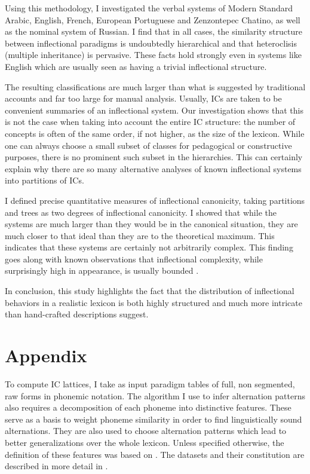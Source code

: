 \documentclass[output=paper]{langscibook}
\begin{document}
    Using this methodology, I investigated the verbal systems of Modern Standard Arabic, English, French, European Portuguese and Zenzontepec Chatino, as well as the nominal system of Russian. I find that in all cases, the similarity structure between inflectional paradigms is undoubtedly hierarchical and that heteroclisis (multiple inheritance) is pervasive. These facts hold strongly even in systems like English which are usually seen as having a trivial inflectional structure.

    The resulting classifications are much larger than what is suggested by traditional accounts and far too large for manual analysis. Usually, ICs are  taken to be convenient summaries of an inflectional system. Our investigation shows that this is not the case when taking into account the entire IC structure: the number of concepts is often of the same order, if not higher, as the size of the lexicon. While one can always choose a small subset of classes for pedagogical or constructive purposes, there is no prominent such subset in the hierarchies. This can certainly explain why there are so many alternative analyses of known inflectional systems into partitions of ICs.

    I defined precise quantitative measures of inflectional canonicity, taking partitions and trees as two degrees of inflectional canonicity. I showed that while the systems are much larger than they would be in the canonical situation, they are much closer to that ideal than they are to the theoretical maximum. This indicates that these systems are certainly not arbitrarily complex. This finding goes along with known observations that inflectional complexity, while surprisingly high in appearance, is usually bounded \citep{Carstairs1987,Carstairs-McCarthy1991,AckermanBlevinsMalouf2009,AckermanMalouf2015}.

    In conclusion, this study highlights the fact that the distribution of inflectional behaviors in a realistic lexicon is both highly structured and much more intricate than hand-crafted descriptions suggest.

    \section*{Appendix}
    \label{Appendix:beniamine}

    To compute IC lattices, I take as input paradigm tables of full, non segmented, raw forms in phonemic notation. The algorithm I use to infer alternation patterns \citep{BeniaminePhd,Beniamine2017} also requires a decomposition of each phoneme into distinctive features. These serve as a basis to weight phoneme similarity in order to find linguistically sound alternations. They are also used to choose alternation patterns which lead to better generalizations over the whole lexicon. Unless specified otherwise, the definition of these features was based on \citet{HayesFeatures}. The datasets and their constitution are described in more detail in \citet{BeniaminePhd}.
\end{document}
